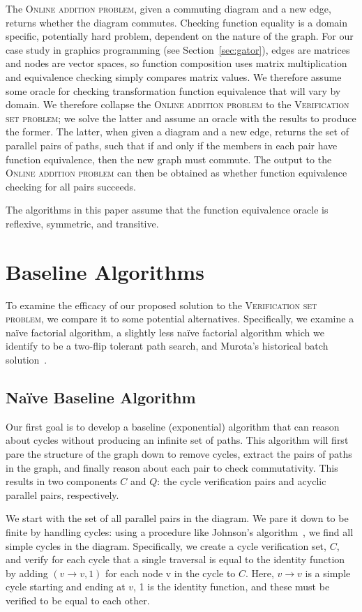 \documentclass[sigplan,review,nonacm=true]{acmart}
\begin{document}
The \textsc{Online addition problem}, given a commuting diagram and a new edge, returns whether the diagram commutes.
Checking function equality is a domain specific, potentially hard problem, dependent on the nature of the graph.
For our case study in graphics programming (see Section~\ref{sec:gator}), edges are matrices and nodes are vector spaces, so function composition uses matrix multiplication and equivalence checking simply compares matrix values.
We therefore assume some oracle for checking transformation function equivalence that will vary by domain.
%
We therefore collapse the \textsc{Online addition problem} to the \textsc{Verification set problem}; we solve the latter and assume an oracle with the results to produce the former.
The latter, when given a diagram and a new edge, returns the set of parallel pairs of paths, such that if and only if the members in each pair have function equivalence, then the new graph must commute.
The output to the \textsc{Online addition problem} can then be obtained as whether function equivalence checking for all pairs succeeds.

The algorithms in this paper assume that the function equivalence oracle is reflexive, symmetric, and transitive.

\section{Baseline Algorithms}

To examine the efficacy of our proposed solution to the \textsc{Verification set problem}, we compare it to some potential alternatives.
Specifically, we examine a na\"{i}ve factorial algorithm, a slightly less na\"{i}ve factorial algorithm which we identify to be a two-flip tolerant path search, and Murota's historical batch solution~\cite{commutative}.

\subsection{Na\"{i}ve Baseline Algorithm}
Our first goal is to develop a baseline (exponential) algorithm that can reason about cycles without producing an infinite set of paths.  This algorithm will first pare the structure of the graph down to remove cycles, extract the pairs of paths in the graph, and finally reason about each pair to check commutativity.  This results in two components $C$ and $Q$: the cycle verification pairs and acyclic parallel pairs, respectively.

We start with the set of all parallel pairs in the diagram.
We pare it down to be finite by handling cycles: using a procedure like Johnson's algorithm~\cite{johnson}, we find all simple cycles in the diagram.
Specifically, we create a cycle verification set, $C$, and verify for each cycle that a single traversal is equal to the identity function by adding $(v \rightarrow v, 1)$ for each node v in the cycle to $C$.
Here, $v \rightarrow v$ is a simple cycle starting and ending at $v$, 1 is the identity function, and these must be verified to be equal to each other.
\end{document}
